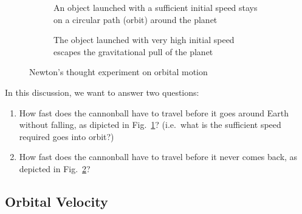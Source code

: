 \begin{figure}[ht]
  \vspace{.2in}\begin{subfigure}{.4\textwidth}
    \centering
    \caption{An object launched with a sufficient initial speed stays on a
      circular path (orbit) around the planet}
    \label{fig:in-orbit}
  \end{subfigure}
  \hspace{.3in}
  \begin{subfigure}{.4\textwidth}
    \centering
    \caption{The object launched with very high initial speed escapes the
      gravitational pull of the planet}
    \label{fig:escape-from-orbit}
  \end{subfigure}
  \caption{Newton's thought experiment on orbital motion}
  \label{fig:thought-experiment}
\end{figure}

In this discussion, we want to answer two questions:
\begin{enumerate}[itemsep=3pt]
\item How fast does the cannonball have to travel before it goes around Earth
  without falling, as dipicted in Fig.~\ref{fig:in-orbit}? (i.e.\ what is the
  sufficient speed required goes into orbit?)
\item How fast does the cannonball have to travel before it never comes back,
  as depicted in Fig.~\ref{fig:escape-from-orbit}?
\end{enumerate}  



\subsection{Orbital Velocity}
\label{sec:orbital-velocity}


